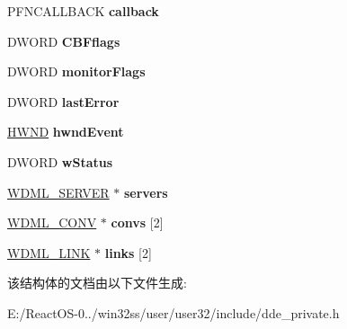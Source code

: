 \begin{DoxyCompactItemize}
\mbox{\label{structtag_w_d_m_l___i_n_s_t_a_n_c_e_aded58ee11c94a2a5f743543e03f1b4db}} 
P\+F\+N\+C\+A\+L\+L\+B\+A\+CK {\bfseries callback}
\item 
\mbox{\label{structtag_w_d_m_l___i_n_s_t_a_n_c_e_aa8d63243a326612904b1cbfd5570c101}} 
D\+W\+O\+RD {\bfseries C\+B\+Fflags}
\item 
\mbox{\label{structtag_w_d_m_l___i_n_s_t_a_n_c_e_a2a1530475bc108f43f00b983b88228fd}} 
D\+W\+O\+RD {\bfseries monitor\+Flags}
\item 
\mbox{\label{structtag_w_d_m_l___i_n_s_t_a_n_c_e_a25041a26b0a3e7a337d4cd663dc6753f}} 
D\+W\+O\+RD {\bfseries last\+Error}
\item 
\mbox{\label{structtag_w_d_m_l___i_n_s_t_a_n_c_e_ae2081de42cc3e265055396d915024891}} 
\hyperlink{interfacevoid}{H\+W\+ND} {\bfseries hwnd\+Event}
\item 
\mbox{\label{structtag_w_d_m_l___i_n_s_t_a_n_c_e_a47b2e238aaa101682da9280140e18557}} 
D\+W\+O\+RD {\bfseries w\+Status}
\item 
\mbox{\label{structtag_w_d_m_l___i_n_s_t_a_n_c_e_aeafd13ce9cf3a916486cf1d5b8cdd58f}} 
\hyperlink{structtag_w_d_m_l___s_e_r_v_e_r}{W\+D\+M\+L\+\_\+\+S\+E\+R\+V\+ER} $\ast$ {\bfseries servers}
\item 
\mbox{\label{structtag_w_d_m_l___i_n_s_t_a_n_c_e_abd5a88cb1defd4d4109c51696196274a}} 
\hyperlink{structtag_w_d_m_l___c_o_n_v}{W\+D\+M\+L\+\_\+\+C\+O\+NV} $\ast$ {\bfseries convs} \mbox{[}2\mbox{]}
\item 
\mbox{\label{structtag_w_d_m_l___i_n_s_t_a_n_c_e_a92af2a06b3e842d2bcbd4e22049647c8}} 
\hyperlink{structtag_w_d_m_l___l_i_n_k}{W\+D\+M\+L\+\_\+\+L\+I\+NK} $\ast$ {\bfseries links} \mbox{[}2\mbox{]}
\end{DoxyCompactItemize}


该结构体的文档由以下文件生成\+:\begin{DoxyCompactItemize}
\item 
E\+:/\+React\+O\+S-\/0../win32ss/user/user32/include/dde\+\_\+private.\+h\end{DoxyCompactItemize}
